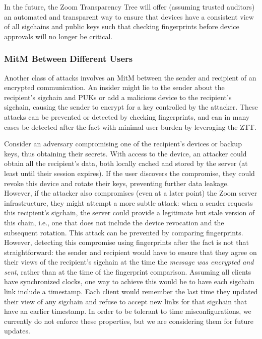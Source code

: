 In the future, the Zoom Transparency Tree will offer (assuming trusted auditors) an automated and
transparent way to ensure that devices have a consistent view of all sigchains and public keys such
that checking fingerprints before device approvals will no longer be critical.

\subsubsection{MitM Between Different Users}
Another class of attacks involves an MitM between the sender and recipient of an encrypted
communication. An insider might lie to the sender about the recipient's sigchain and PUKs or add a
malicious device to the recipient's sigchain, causing the sender to encrypt for a key controlled by
the attacker. These attacks can be prevented or detected by checking fingerprints, and can in many
cases be detected after-the-fact with minimal user burden by leveraging the ZTT.

Consider an adversary compromising one of the recipient's devices or backup keys, thus obtaining
their secrets. With access to the device, an attacker could obtain all the recipient's data, both
locally cached and stored by the server (at least until their session expires). If the user
discovers the compromise, they could revoke this device and rotate their keys, preventing further
data leakage. However, if the attacker also compromises (even at a later point) the Zoom server
infrastructure, they might attempt a more subtle attack: when a sender requests this recipient's
sigchain, the server could provide a legitimate but stale version of this chain, i.e., one that does
not include the device revocation and the subsequent rotation. This attack can be prevented by
comparing fingerprints. However, detecting this compromise using fingerprints after the fact is not
that straightforward: the sender and recipient would have to ensure that they agree on their views
of the recipient's sigchain at the time the \emph{message was encrypted and sent}, rather than at
the time of the fingerprint comparison. Assuming all clients have synchronized clocks, one way to
achieve this would be to have each sigchain link include a timestamp. Each client would remember the
last time they updated their view of any sigchain and refuse to accept new links for that sigchain
that have an earlier timestamp. In order to be tolerant to time misconfigurations, we currently do
not enforce these properties, but we are considering them for future updates.

